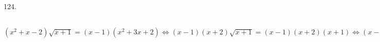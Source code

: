 124. $(x^2+x-2)\sqrt{x+1}=(x-1)(x^2+3x+2)\Leftrightarrow(x-1)(x+2)\sqrt{x+1}=(x-1)(x+2)(x+1)\Leftrightarrow
(x-1)(x+2)(\sqrt{x+1}-x-1)=0\Leftrightarrow
\begin{cases}\left[\begin{array}{l} x=1,\\ x=-2,\\ \sqrt{x+1}=x+1.\end{array}\right.\\ x\geqslant-1.\end{cases}\Leftrightarrow
\begin{cases}\left[\begin{array}{l} x=1,\\ x+1=x^2+2x+1.\end{array}\right.\\ x\geqslant-1.\end{cases}\Leftrightarrow
\begin{cases}\left[\begin{array}{l} x=1,\\ x(x+1)=0.\end{array}\right.\\ x\geqslant-1.\end{cases}\Leftrightarrow x\in\{-1;0;1\}$\\

